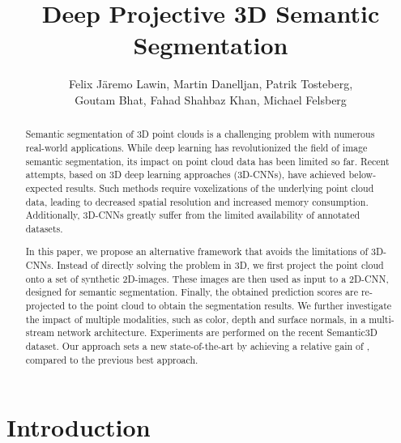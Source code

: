 \documentclass[runningheads,a4paper]{llncs}
\begin{document}
\mainmatter  

\title{Deep Projective 3D Semantic Segmentation}


\author{Felix J\"aremo Lawin, Martin Danelljan, Patrik Tosteberg, \\ Goutam Bhat, Fahad Shahbaz Khan, Michael Felsberg}




\maketitle


\begin{abstract}
Semantic segmentation of 3D point clouds is a challenging problem with numerous real-world applications. While deep learning has revolutionized the field of image semantic segmentation, its impact on point cloud data has been limited so far. Recent attempts, based on 3D deep learning approaches (3D-CNNs), have achieved below-expected results. Such methods require voxelizations of the underlying point cloud data, leading to decreased spatial resolution and increased memory consumption. Additionally, 3D-CNNs greatly suffer from the limited availability of annotated datasets.

In this paper, we propose an alternative framework that avoids the limitations of 3D-CNNs. Instead of directly solving the problem in 3D, we first project the point cloud onto a set of synthetic 2D-images. These images are then used as input to a 2D-CNN, designed for semantic segmentation. Finally, the obtained prediction scores are re-projected to the point cloud to obtain the segmentation results. We further investigate the impact of multiple modalities, such as color, depth and surface normals, in a multi-stream network architecture. Experiments are performed on the recent Semantic3D dataset. Our approach sets a new state-of-the-art by achieving a relative gain of , compared to the previous best approach.
\end{abstract}


\section{Introduction}
\end{document}

